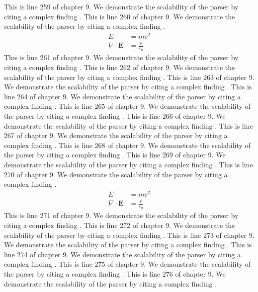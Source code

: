 This is line 259 of chapter 9. We demonstrate the scalability of the parser by citing a complex finding \cite{ref9_259}.
This is line 260 of chapter 9. We demonstrate the scalability of the parser by citing a complex finding \cite{ref9_260}.
\begin{align*}
  E &= mc^2 \\
  \nabla \cdot \mathbf{E} &= \frac{\rho}{\varepsilon_0}
\end{align*}
This is line 261 of chapter 9. We demonstrate the scalability of the parser by citing a complex finding \cite{ref9_261}.
This is line 262 of chapter 9. We demonstrate the scalability of the parser by citing a complex finding \cite{ref9_262}.
This is line 263 of chapter 9. We demonstrate the scalability of the parser by citing a complex finding \cite{ref9_263}.
This is line 264 of chapter 9. We demonstrate the scalability of the parser by citing a complex finding \cite{ref9_264}.
This is line 265 of chapter 9. We demonstrate the scalability of the parser by citing a complex finding \cite{ref9_265}.
This is line 266 of chapter 9. We demonstrate the scalability of the parser by citing a complex finding \cite{ref9_266}.
This is line 267 of chapter 9. We demonstrate the scalability of the parser by citing a complex finding \cite{ref9_267}.
This is line 268 of chapter 9. We demonstrate the scalability of the parser by citing a complex finding \cite{ref9_268}.
This is line 269 of chapter 9. We demonstrate the scalability of the parser by citing a complex finding \cite{ref9_269}.
This is line 270 of chapter 9. We demonstrate the scalability of the parser by citing a complex finding \cite{ref9_270}.
\begin{align*}
  E &= mc^2 \\
  \nabla \cdot \mathbf{E} &= \frac{\rho}{\varepsilon_0}
\end{align*}
This is line 271 of chapter 9. We demonstrate the scalability of the parser by citing a complex finding \cite{ref9_271}.
This is line 272 of chapter 9. We demonstrate the scalability of the parser by citing a complex finding \cite{ref9_272}.
This is line 273 of chapter 9. We demonstrate the scalability of the parser by citing a complex finding \cite{ref9_273}.
This is line 274 of chapter 9. We demonstrate the scalability of the parser by citing a complex finding \cite{ref9_274}.
This is line 275 of chapter 9. We demonstrate the scalability of the parser by citing a complex finding \cite{ref9_275}.
This is line 276 of chapter 9. We demonstrate the scalability of the parser by citing a complex finding \cite{ref9_276}.
